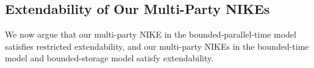 
\subsection{Extendability of Our Multi-Party NIKEs} 
\label{sec:extendable}
We now argue that our multi-party NIKE in the bounded-parallel-time model satisfies restricted extendability, and our multi-party NIKEs in the bounded-time model and bounded-storage model satisfy extendability.
%


